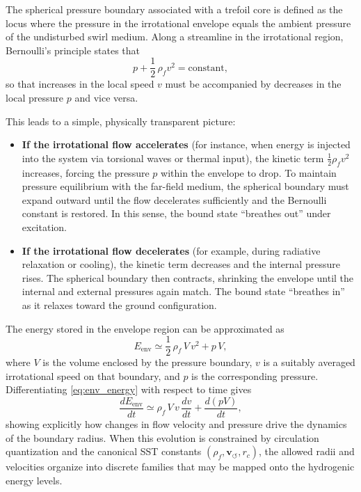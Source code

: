 \documentclass[10pt,reprint,aps,onecolumn,nofootinbib]{revtex4-2}
\newcommand{\vswirl}{\mathbf{v}_{\!\boldsymbol{\circlearrowleft}}}
\newcommand{\rhof}{\rho_{\!f}}                           %
\begin{document}
        The spherical pressure boundary associated with a trefoil core is defined as the locus where the pressure in the irrotational envelope equals the ambient pressure of the undisturbed swirl medium. Along a streamline in the irrotational region, Bernoulli's principle states that
        \begin{equation}
            p + \frac{1}{2}\,\rhof v^2 = \text{constant},
            \label{eq:Bernoulli}
        \end{equation}
        so that increases in the local speed \(v\) must be accompanied by decreases in the local pressure \(p\) and vice versa.\cite{Batchelor1967}

        This leads to a simple, physically transparent picture:

        \begin{itemize}
            \item \textbf{If the irrotational flow accelerates} (for instance, when energy is injected into the system via torsional waves or thermal input), the kinetic term \(\frac{1}{2}\rhof v^2\) increases, forcing the pressure \(p\) within the envelope to drop. To maintain pressure equilibrium with the far-field medium, the spherical boundary must expand outward until the flow decelerates sufficiently and the Bernoulli constant is restored. In this sense, the bound state ``breathes out'' under excitation.
            \item \textbf{If the irrotational flow decelerates} (for example, during radiative relaxation or cooling), the kinetic term decreases and the internal pressure rises. The spherical boundary then contracts, shrinking the envelope until the internal and external pressures again match. The bound state ``breathes in'' as it relaxes toward the ground configuration.
        \end{itemize}

        The energy stored in the envelope region can be approximated as
        \begin{equation}
            E_{\text{env}}
            \simeq
            \frac{1}{2}\,\rhof\,V\,v^2 + p\,V,
            \label{eq:env_energy}
        \end{equation}
        where \(V\) is the volume enclosed by the pressure boundary, \(v\) is a suitably averaged irrotational speed on that boundary, and \(p\) is the corresponding pressure. Differentiating \eqref{eq:env_energy} with respect to time gives
        \begin{equation}
            \frac{dE_{\text{env}}}{dt}
            \simeq
            \rhof\,V\,v\,\frac{dv}{dt}
            + \frac{d(pV)}{dt},
        \end{equation}
        showing explicitly how changes in flow velocity and pressure drive the dynamics of the boundary radius. When this evolution is constrained by circulation quantization and the canonical SST constants \((\rhof, \vswirl, r_c)\), the allowed radii and velocities organize into discrete families that may be mapped onto the hydrogenic energy levels.\cite{IskandaraniHydrogenGS}
\end{document}
